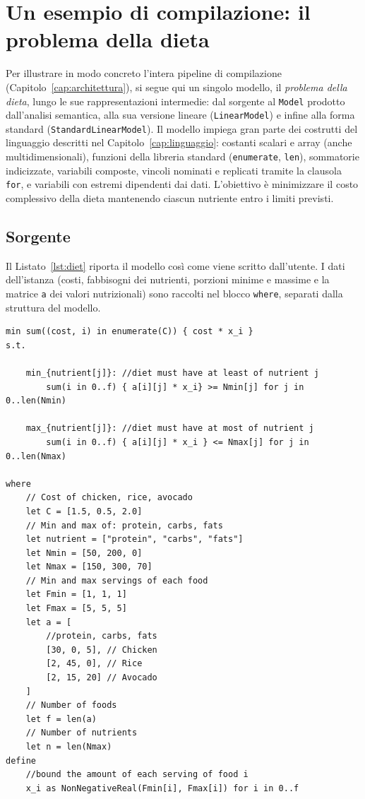 
\chapter{Un esempio di compilazione: il problema della dieta}
\label{app:esempi}

Per illustrare in modo concreto l'intera pipeline di compilazione
(Capitolo~\ref{cap:architettura}), si segue qui un singolo modello, il
\emph{problema della dieta}, lungo le sue rappresentazioni intermedie: dal
sorgente al \texttt{Model} prodotto dall'analisi semantica, alla sua versione
lineare (\texttt{LinearModel}) e infine alla forma standard
(\texttt{StandardLinearModel}). Il modello impiega gran parte dei costrutti del
linguaggio descritti nel Capitolo~\ref{cap:linguaggio}: costanti scalari e array
(anche multidimensionali), funzioni della libreria standard (\texttt{enumerate},
\texttt{len}), sommatorie indicizzate, variabili composte, vincoli nominati e
replicati tramite la clausola \texttt{for}, e variabili con estremi dipendenti dai
dati. L'obiettivo è minimizzare il costo complessivo della dieta mantenendo
ciascun nutriente entro i limiti previsti.

\section{Sorgente}
\label{app:diet-sorgente}

Il Listato~\ref{lst:diet} riporta il modello così come viene scritto dall'utente.
I dati dell'istanza (costi, fabbisogni dei nutrienti, porzioni minime e massime e
la matrice \texttt{a} dei valori nutrizionali) sono raccolti nel blocco
\texttt{where}, separati dalla struttura del modello.

\begin{lstlisting}[language=rooc, caption={Il problema della dieta in ROOC.}, label={lst:diet}]
min sum((cost, i) in enumerate(C)) { cost * x_i }
s.t.

    min_{nutrient[j]}: //diet must have at least of nutrient j
        sum(i in 0..f) { a[i][j] * x_i} >= Nmin[j] for j in 0..len(Nmin)

    max_{nutrient[j]}: //diet must have at most of nutrient j
        sum(i in 0..f) { a[i][j] * x_i } <= Nmax[j] for j in 0..len(Nmax)

where
    // Cost of chicken, rice, avocado
    let C = [1.5, 0.5, 2.0]
    // Min and max of: protein, carbs, fats
    let nutrient = ["protein", "carbs", "fats"]
    let Nmin = [50, 200, 0]
    let Nmax = [150, 300, 70]
    // Min and max servings of each food
    let Fmin = [1, 1, 1]
    let Fmax = [5, 5, 5]
    let a = [
        //protein, carbs, fats
        [30, 0, 5], // Chicken
        [2, 45, 0], // Rice
        [2, 15, 20] // Avocado
    ]
    // Number of foods
    let f = len(a)
    // Number of nutrients
    let n = len(Nmax)
define
    //bound the amount of each serving of food i
    x_i as NonNegativeReal(Fmin[i], Fmax[i]) for i in 0..f
\end{lstlisting}

